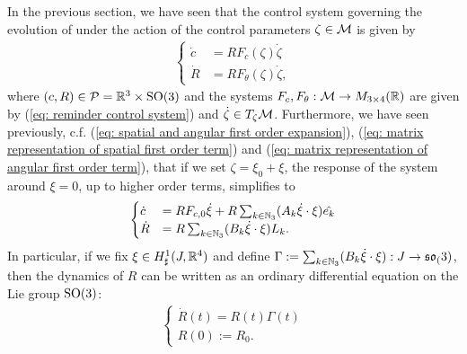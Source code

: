 In the previous section, we have seen that the control system governing the evolution of \spr under the action of the control parameters $\zeta \in \mathcal{M}$ is given by
\begin{align}
\begin{cases}
	\dot{c} &= R F_c(\zeta) \dot{\zeta}\\
	\dot{R} &= R F_{\theta}(\zeta) \dot{\zeta},
\end{cases}
\end{align}
where $(c,R) \in \mathcal{P} = \mathbb{R}^3 \times \operatorname{SO}(3)$ and the systems $F_{c}, F_{\theta}: \mathcal{M} \to M_{3 \times
 4}(\mathbb{R})$ are given by (\ref{eq: reminder control system}) and $\dot{\zeta}  \in T_{\zeta}\mathcal{M}$. Furthermore, we have seen previously, c.f. (\ref{eq: spatial and angular first order expansion}), (\ref{eq: matrix representation of spatial first order term}) and (\ref{eq: matrix representation of angular first order term}), that if we set $\zeta = \xi_0 + \xi$, the response of the system around $\xi = 0$, up to higher order terms, simplifies to
 \begin{align}
 \begin{cases}
 	\dot{c} &= R F_{c,0} \dot{\xi} + R \sum_{k \in \mathbb{N}_3}(A_k \dot{\xi} \cdot \xi)\hat{e_k}\\
 	\dot{R} &= R \sum_{k \in \mathbb{N}_3} (B_k \dot{\xi} \cdot \xi) L_k.
 \end{cases}
 \end{align}
In particular, if we fix $\xi \in H^1_{\sharp}(J, \mathbb{R}^4)$ and define $\Gamma := \sum_{k \in \mathbb{N}_3} (B_k \dot{\xi} \cdot \xi): J \to \mathfrak{so}_(3)$, then the dynamics of $R$ can be written as an ordinary differential equation on the Lie group $\operatorname{SO}(3)$:
\begin{align}
\label{eq: orientation ode}
\begin{cases}
	\dot{R}(t) = R(t) \Gamma(t)\\
	R(0) := R_0.
\end{cases}
\end{align}

